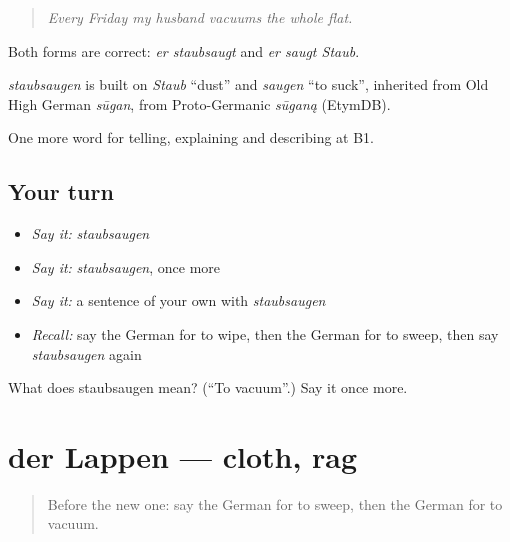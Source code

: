 \begin{quote}
\emph{Every Friday my husband vacuums the whole flat.}
\end{quote}

Both forms are correct: \emph{er staubsaugt} and \emph{er saugt Staub}.

\begin{cousinweb}
\emph{staubsaugen} is built on \emph{Staub} \textquotedblleft{}dust\textquotedblright{} and \emph{saugen} \textquotedblleft{}to suck\textquotedblright{}, inherited from Old High German \emph{sūgan}, from Proto-Germanic \emph{sūganą} (EtymDB).
\end{cousinweb}

\begin{grammarlens}[title={What you've built}]
One more word for telling, explaining and describing at B1.
\end{grammarlens}

\subsection*{Your turn}
\begin{itemize}
\raggedright
  \item \emph{Say it:} \emph{staubsaugen}
  \item \emph{Say it:} \emph{staubsaugen}, once more
  \item \emph{Say it:} a sentence of your own with \emph{staubsaugen}
  \item \emph{Recall:} say the German for to wipe, then the German for to sweep, then say \emph{staubsaugen} again
\end{itemize}

\begin{tcolorbox}[breakable,colback=teal!4,colframe=teal!35!black,title={Before you move on}]
What does staubsaugen mean? (\textquotedblleft{}To vacuum\textquotedblright{}.) Say it once more.
\end{tcolorbox}
\section[der Lappen]{der Lappen — cloth, rag}

\label{lesson:GE-C526-lappen}



\begin{quote}
Before the new one: say the German for to sweep, then the German for to vacuum.
\end{quote}

